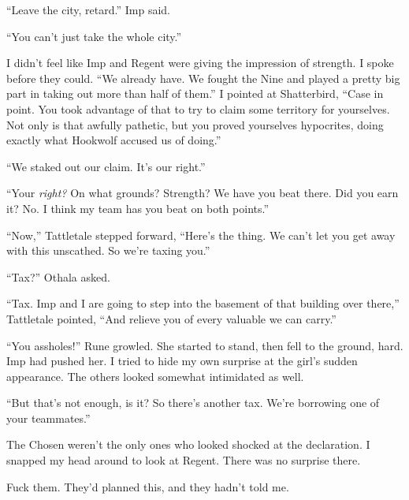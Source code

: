 ``Leave the city, retard.''  Imp said.



``You can't just take the whole city.''



I didn't feel like Imp and Regent were giving the impression of strength.  I spoke before they could.  ``We already have.  We fought the Nine and played a pretty big part in taking out more than half of them.''  I pointed at Shatterbird, ``Case in point.  You took advantage of that to try to claim some territory for yourselves.  Not only is that awfully pathetic, but you proved yourselves hypocrites, doing exactly what Hookwolf accused us of doing.''



``We staked out our claim.  It's our right.''



``Your \emph{right?}  On what grounds?  Strength?  We have you beat there.  Did you earn it?  No.  I think my team has you beat on both points.''



``Now,'' Tattletale stepped forward, ``Here's the thing.  We can't let you get away with this unscathed.  So we're taxing you.''



``Tax?''  Othala asked.



``Tax.  Imp and I are going to step into the basement of that building over there,'' Tattletale pointed, ``And relieve you of every valuable we can carry.''



``You assholes!'' Rune growled.  She started to stand, then fell to the ground, hard.  Imp had pushed her.  I tried to hide my own surprise at the girl's sudden appearance.  The others looked somewhat intimidated as well.



``But that's not enough, is it?  So there's another tax.  We're borrowing one of your teammates.''



The Chosen weren't the only ones who looked shocked at the declaration.  I snapped my head around to look at Regent.  There was no surprise there.



Fuck them.  They'd planned this, and they hadn't told me.





